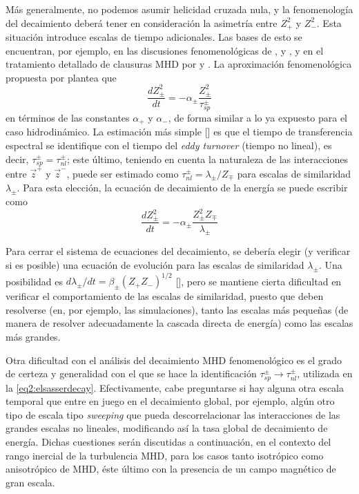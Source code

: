 Más generalmente, no podemos asumir helicidad cruzada nula, y la
fenomenología del decaimiento deberá tener en consideración la
asimetría entre $Z_+^2$ y $Z_-^2$. Esta situación introduce escalas de
tiempo adicionales. Las bases de esto se encuentran, por ejemplo, en
las discusiones fenomenológicas de \cite{iroshnikov_turbulence_1964},
\cite{kraichnan_inertial-range_1965} y \cite{dobrowolny_fully_1980}, y
en el tratamiento detallado de clausuras MHD por
\cite{pouquet_strong_1976} y \cite{grappin_dependence_1983}. La
aproximación fenomenológica propuesta por
\cite{hossain_phenomenology_1995} plantea que
\begin{equation}
  \frac{dZ_\pm^2}{dt} = -\alpha_\pm \frac{Z_\pm^2}{\tau_{sp}^\pm}
\end{equation}
en términos de las constantes $\alpha_+$ y $\alpha_-$, de forma
similar a lo ya expuesto para el caso hidrodinámico. La estimación más
simple [\cite{pouquet_strong_1976, grappin_dependence_1983}] es que el
tiempo de transferencia espectral se identifique con el tiempo del
\textit{eddy turnover} (tiempo no lineal), es decir, $\tau_{sp}^\pm =
\tau_{nl}^\pm$; este último, teniendo en cuenta la naturaleza de las
interacciones entre $\vec{z}^+$ y $\vec{z}^-$, puede ser estimado como
$\tau_{nl}^\pm = \lambda_\pm / Z_\mp$ para escalas de similaridad
$\lambda_\pm$. Para esta elección, la ecuación de decaimiento de la
energía se puede escribir como
\begin{equation}\label{eq2:elsasserdecay}
  \frac{dZ_\pm^2}{dt} = -\alpha_\pm \frac{Z_\pm^2 Z_\mp}{\lambda_\pm}
\end{equation}

Para cerrar el sistema de ecuaciones del decaimiento, se debería
elegir (y verificar si es posible) una ecuación de evolución para las
escalas de similaridad $\lambda_\pm$. Una posibilidad es
$d\lambda_\pm/dt = \beta_\pm (Z_+Z_-)^{1/2}$
[\cite{hossain_phenomenology_1995}], pero se mantiene cierta dificultad
en verificar el comportamiento de las escalas de similaridad, puesto
que deben resolverse (en, por ejemplo, las simulaciones), tanto las
escalas más pequeñas (de manera de resolver adecuadamente la cascada
directa de energía) como las escalas más grandes.

Otra dificultad con el análisis del decaimiento MHD fenomenológico es el grado de
certeza y generalidad con el que se hace la identificación
$\tau_{sp}^\pm \rightarrow \tau_{nl}^\pm$, utilizada en la
\cref{eq2:elsasserdecay}. Efectivamente, cabe preguntarse si hay alguna
otra escala temporal que entre en juego en el decaimiento global, por
ejemplo, algún otro tipo de escala tipo \textit{sweeping} que pueda
descorrelacionar las interacciones de las grandes escalas no lineales,
modificando así la tasa global de decaimiento de energía. Dichas
cuestiones serán discutidas a continuación, en el contexto del rango
inercial de la turbulencia MHD, para los casos tanto isotrópico como
anisotrópico de MHD, éste último con la presencia de un campo
magnético de gran escala.

